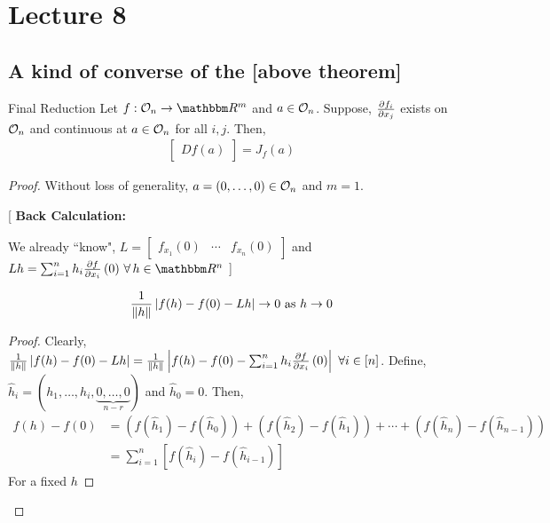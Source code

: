 \documentclass[Analysis-3]{subfiles}
\begin{document}
\chapter*{Lecture 8} %
\setcounter{chapter}{8} %
\setcounter{section}{0}

\section{A kind of converse of the [above theorem]}

\begin{Thm}{Final Reduction}{}
  Let $ f :\Op{n} \to \R^m $ and $ a \in \mathcal{O}_{n} $. Suppose, $ \pdv{f_i}{x_j} $ exists on $ \mathcal{O}_{n} $ and continuous at $ a \in \mathcal{O}_{n} $ for all $ i,j $. Then,
  \begin{align*}
    \begin{bmatrix}
      Df(a)
    \end{bmatrix} = J_{f}(a)
  \end{align*}
\end{Thm}

\begin{proof}
  Without loss of generality, $ a = (0,\ldots,0) \in \mathcal{O}_{n} $ and $ m = 1 $.

    [
      \textbf{Back Calculation:}

      We already ``know", $ L = \begin{bmatrix}
          f_{x_1}(0) & \cdots & f_{x_n}(0)
        \end{bmatrix} $ and $ Lh = \sum_{i=1}^{n}h_i\pdv{f}{x_i}\left( 0 \right) \, \forall\, h \in \R^n $
    ]

  \begin{clmBox}
    \begin{align*}
      \frac{1}{\norm{h}}\left| f(h)-f(0)-Lh \right| \to 0 \text{ as } h \to 0
    \end{align*}
  \end{clmBox}

  \begin{proof}
    Clearly, $ \frac{1}{\norm{h}}\left| f(h)-f(0)-Lh \right| = \frac{1}{\norm{h}}\left| f(h)-f(0)-\sum_{i=1}^{n}h_i\pdv{f}{x_i}\left( 0 \right) \right| \ \forall i \in [n]$. Define, $ \hat{h}_i = \left(h_1, \ldots, h_i, \underbrace{0,\ldots,0}_{n-r} \right) $ and $ \hat{h}_0  = 0 $. Then,
    \begin{align*}
      f(h)-f(0) & = \left( f\left(\hat{h}_1\right) - f\left(\hat{h}_0\right) \right) + \left( f\left(\hat{h}_2\right) - f\left(\hat{h}_1\right) \right) + \cdots + \left( f\left(\hat{h}_{n}\right) - f\left(\hat{h}_{n-1}\right) \right) \\
                & =\sum_{i=1}^{n} \left[ f\left(\hat{h}_{i}\right) - f\left(\hat{h}_{i-1}\right) \right]
    \end{align*}
    For a fixed $ h $
  \end{proof}
\end{proof}
\end{document}
